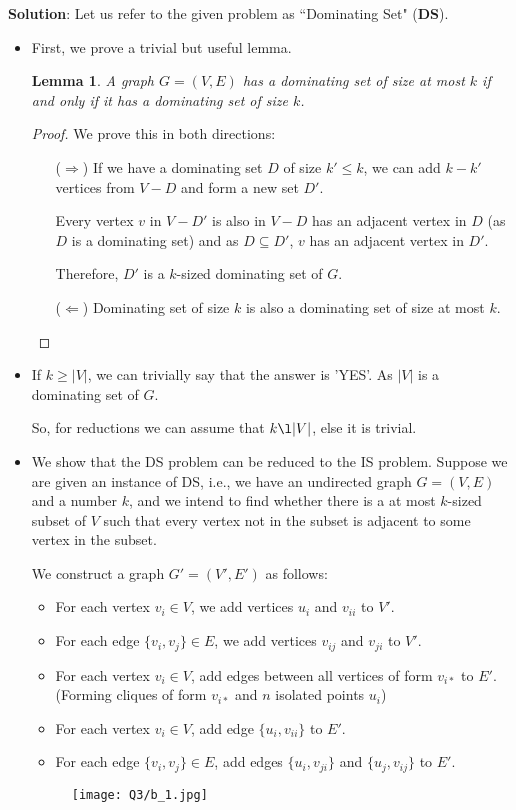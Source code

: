 \documentclass[11pt, fleqn]{article}
\newtheorem{lemma}{Lemma}
\begin{document}
\textbf{Solution}: Let us refer to the given problem as ``Dominating Set" (\textbf{DS}).
\begin{itemize}
    \item First, we prove a trivial but useful lemma.
    \begin{lemma}
    \label{Lemma1}
    A graph $G = (V, E)$ has a dominating set of size at most $k$ if and only if it has a dominating set of size $k$.
    \end{lemma}
    \begin{proof}
        We prove this in both directions:
        \begin{itemize}
            \item[($\Rightarrow$)] If we have a dominating set $D$ of size $k' \le k$, we can add $k - k'$ vertices from $V - D$ and form a new set $D'$.
                
            Every vertex $v$ in $V - D'$ is also in $V - D$ has an adjacent vertex in $D$ (as $D$ is a dominating set) and as $D \subseteq D'$, $v$ has an adjacent vertex in $D'$.
                
            Therefore, $D'$ is a $k$-sized dominating set of $G$.
            \item[($\Leftarrow$)] Dominating set of size $k$ is also a dominating set of size at most $k$.
        \end{itemize}
    \end{proof}
    
    \item If $k \ge |V|$, we can trivially say that the answer is 'YES'. As $|V|$ is a dominating set of $G$.
    
    So, for reductions we can assume that $k \l |V|$, else it is trivial.
    
    \item We show that the DS problem can be reduced to the IS problem. Suppose we are given an instance of DS, i.e., we have an undirected graph $G = (V, E)$ and a number $k$, and we intend to find whether there is a at most $k$-sized subset of $V$ such that every vertex not in the subset is adjacent to some vertex in the subset.
    
    We construct a graph $G' = (V', E')$ as follows:
    \begin{itemize}
        \item For each vertex $v_i \in V$, we add vertices $u_i$ and $v_{ii}$ to $V'$.
        \item For each edge $\{v_i, v_j\} \in E$, we add vertices $v_{ij}$ and $v_{ji}$ to $V'$.
        \item For each vertex $v_i \in V$, add edges between all vertices of form $v_{i*}$ to $E'$. (Forming cliques of form $v_{i*}$ and $n$ isolated points $u_i$)
        \item For each vertex $v_i \in V$, add edge $\{u_i, v_{ii}\}$ to $E'$.
        \item For each edge $\{v_i, v_j\} \in E$, add edges $\{u_i, v_{ji}\}$ and $\{u_j, v_{ij}\}$ to $E'$.
    \end{itemize}
    \begin{figure}[H]
        \texttt{[image: Q3/b\_1.jpg]}
    \end{figure}
    

\end{itemize}
\end{document}
